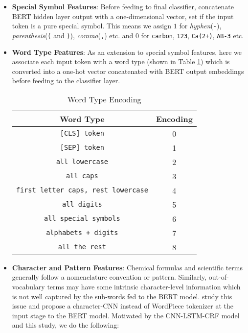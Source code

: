 \begin{itemize}
    \item \textbf{Special Symbol Features}: Before feeding to final classifier, concatenate BERT hidden layer output with a one-dimensional vector, set if the input token is a pure special symbol. This means we assign $1$ for \textit{hyphen}(\texttt{-}), \textit{parenthesis}(\texttt{(} and \texttt{)}), \textit{comma}(\texttt{,}) etc. and $0$ for \texttt{carbon}, \texttt{123}, \texttt{Ca(2+)}, \texttt{AB-3} etc.
    
    \item \textbf{Word Type Features}: As an extension to special symbol features, here we associate each input token with a word type (shown in Table \ref{tab:word_type_encoding}) which is converted into a one-hot vector concatenated with BERT output embeddings before feeding to the classifier layer.
    
    \begin{table}[h!]
    \centering
    \begin{tabular}{|c|c|}\hline
    	\textbf{Word Type} & \textbf{Encoding}\\\hline
    	\texttt{[CLS] token} & 0\\\hline
    	\texttt{[SEP] token} & 1\\\hline
    	\texttt{all lowercase} & 2\\\hline
    	\texttt{all caps} & 3\\\hline
    	\texttt{first letter caps, rest lowercase} & 4\\\hline
    	\texttt{all digits} & 5\\\hline
    	\texttt{all special symbols} & 6\\\hline
    	\texttt{alphabets + digits} & 7\\\hline
    	\texttt{all the rest} & 8\\\hline
    	\end{tabular}
        \caption{Word Type Encoding}
        \label{tab:word_type_encoding}
    \end{table}
    
    \item \textbf{Character and Pattern Features}: Chemical formulas and scientific terms generally follow a nomenclature convention or pattern. Similarly, out-of-vocabulary terms may have some intrinsic character-level information which is not well captured by the sub-words fed to the BERT model. \cite{boukkouri2020characterbert} study this issue and propose a character-CNN instead of WordPiece tokenizer at the input stage to the BERT model. Motivated by the CNN-LSTM-CRF model and this study, we do the following:
    

\end{itemize}
